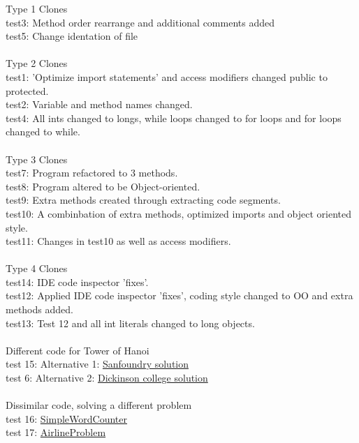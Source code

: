 \begin{tabbing}
Type 1 Clones\\
test3: Method order rearrange and additional comments added\\
test5: Change identation of file\\

\\Type 2 Clones\\
test1: 'Optimize import statements' and access modifiers changed public to protected.\\
test2: Variable and method names changed.\\
test4: All ints changed to longs, while loops changed to for loops and for loops changed to while.\\

\\Type 3 Clones\\
test7: Program refactored to 3 methods.\\
test8: Program altered to be Object-oriented.\\
test9: Extra methods created through extracting code segments.\\
test10: A combinbation of extra methods, optimized imports and object oriented style.\\
test11: Changes in test10 as well as access modifiers.\\

\\Type 4 Clones\\
test14: IDE code inspector 'fixes'.\\
test12: Applied IDE code inspector 'fixes', coding style changed to OO and extra methods added.\\
test13: Test 12 and all int literals changed to long objects.\\

\\Different code for Tower of Hanoi\\
test 15: Alternative 1: \href{http://www.sanfoundry.com/java-program-implement-solve-tower-of-hanoi-using-stacks/}{Sanfoundry solution}\\
test 6: Alternative 2:
\href{http://users.dickinson.edu/~braught/courses/cs132s03/code/TowerOfHanoi.src.html}{Dickinson college solution}\\

\\Dissimilar code, solving a different problem\\
test 16: \href{http://www.cs.utexas.edu/~scottm/cs307/javacode/codeSamples/SimpleWordCounter.java}{SimpleWordCounter}\\
test 17: \href{http://www.cs.utexas.edu/~scottm/cs307/javacode/codeSamples/AirlineProblem.java}{AirlineProblem}\\
\end{tabbing}

 
\break



